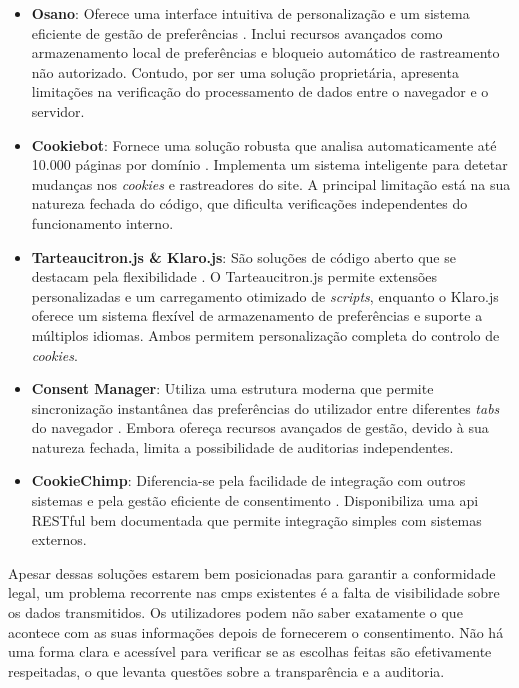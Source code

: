 \begin{itemize}
    \item \textbf{Osano}: Oferece uma interface intuitiva de personalização e um sistema eficiente de gestão de preferências \cite{osano}. Inclui recursos avançados como armazenamento local de preferências e bloqueio automático de rastreamento não autorizado. Contudo, por ser uma solução proprietária, apresenta limitações na verificação do processamento de dados entre o navegador e o servidor.

    \item \textbf{Cookiebot}: Fornece uma solução robusta que analisa automaticamente até 10.000 páginas por domínio \cite{Cookiebot2024}. Implementa um sistema inteligente para detetar mudanças nos \textit{cookies} e rastreadores do site. A principal limitação 
    está na sua natureza fechada do código, que dificulta verificações independentes do funcionamento interno.

    \item \textbf{Tarteaucitron.js \& Klaro.js}: São soluções de código aberto que se destacam pela flexibilidade \cite{tarteaucitron}. O Tarteaucitron.js permite extensões personalizadas e um carregamento otimizado de \textit{scripts}, enquanto o Klaro.js oferece um sistema flexível de armazenamento de preferências e suporte a múltiplos idiomas. Ambos permitem personalização completa do controlo de \textit{cookies}.

    \item \textbf{Consent Manager}: Utiliza uma estrutura moderna que permite sincronização instantânea das preferências do utilizador entre diferentes \textit{tabs} do navegador \cite{ConsentManager2024}. Embora ofereça recursos avançados de gestão, devido à sua natureza fechada, limita a possibilidade de auditorias independentes.

    \item \textbf{CookieChimp}: Diferencia-se pela facilidade de integração com outros sistemas e pela gestão eficiente de consentimento \cite{CookieChimp2024}. Disponibiliza uma \acrshort{api} RESTful bem documentada que permite integração simples com sistemas externos.
\end{itemize}


Apesar dessas soluções estarem bem posicionadas para garantir a conformidade legal, um problema recorrente nas \acrshort{cmp}s existentes é a falta de visibilidade sobre os dados transmitidos. Os utilizadores podem não saber exatamente o que acontece com as suas informações depois de fornecerem o consentimento. Não há uma forma clara e acessível para verificar se as escolhas feitas são efetivamente respeitadas, o que levanta questões sobre a transparência e a auditoria.

